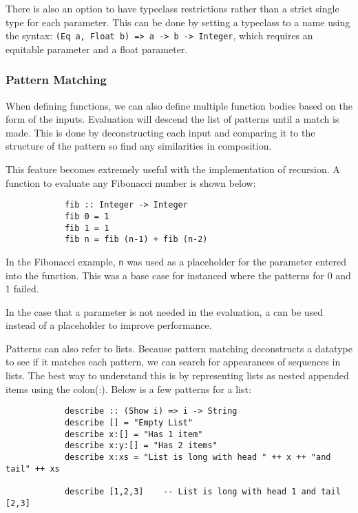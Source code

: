 \documentclass{article}
\begin{document}
        \medskip\noindent
        There is also an option to have typeclass restrictions rather than a strict single type for each parameter. This can be done by setting a typeclass to a name using the syntax: \lstinline{(Eq a, Float b) => a -> b -> Integer}, which requires an equitable parameter and a float parameter.
        
        \subsubsection{Pattern Matching}
        When defining functions, we can also define multiple function bodies based on the form of the inputs. Evaluation will descend the list of patterns until a match is made. This is done by deconstructing each input and comparing it to the structure of the pattern so find any similarities in composition.
        
        \medskip\noindent 
        This feature becomes extremely useful with the implementation of recursion. A function to evaluate any Fibonacci number is shown below:
        \begin{lstlisting}
            fib :: Integer -> Integer
            fib 0 = 1
            fib 1 = 1
            fib n = fib (n-1) + fib (n-2)
        \end{lstlisting}
        
        \medskip\noindent
         In the Fibonacci example, \lstinline{n} was used as a placeholder for the parameter entered into the function. This was a base case for instanced where the patterns for 0 and 1 failed. 
         
         \medskip\noindent
         In the case that a parameter is not needed in the evaluation, a \textunderscore can be used instead of a placeholder to improve performance. 
         
         \bigskip\noindent
         Patterns can also refer to lists. Because pattern matching deconstructs a datatype to see if it matches each pattern, we can search for appearances of sequences in lists. The best way to understand this is by representing lists as nested appended items using the colon(:). Below is a few patterns for a list:
         \begin{lstlisting}
            describe :: (Show i) => i -> String
            describe [] = "Empty List"
            describe x:[] = "Has 1 item"
            describe x:y:[] = "Has 2 items"
            describe x:xs = "List is long with head " ++ x ++ "and tail" ++ xs
            
            describe [1,2,3]    -- List is long with head 1 and tail [2,3]
        \end{lstlisting}
        
\end{document}
